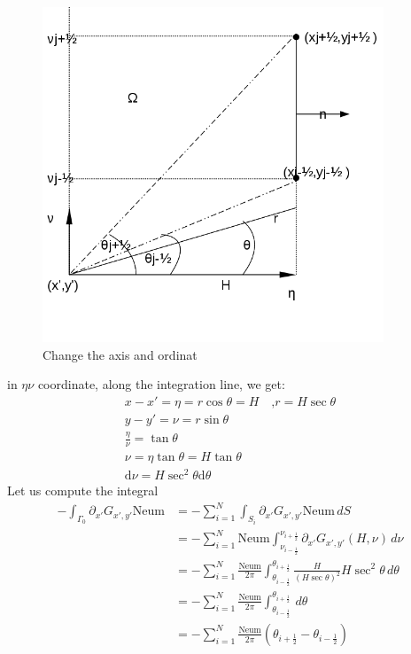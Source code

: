 \documentclass[a4paper,12pt]{article}
\renewcommand{\d}[0]{%
\ensuremath{\text{d}}}
\newcommand{\integ}[3]{%
\ensuremath{\displaystyle{\int^{#2}_{#1} #3}}}
\begin{document}
\begin{enumerate}
\begin{figure}[!htbp]
\begin{center}
\includegraphics[height = 10cm]{changeAxis.png}
\end{center}
 \caption{Change the axis and ordinat}\label{turnAxis}
\end{figure}
in $\eta\nu$ coordinate, along the integration line, we get:
\begin{align}
 x-x'=\eta=r \cos \theta=H \quad\text{,} r=H\sec\theta\\
y-y'=\nu= r\sin \theta\\
\frac{\eta}{\nu}= \tan\theta\\
\nu=\eta \tan \theta=H\tan \theta\\
\d \nu=H \sec^2\theta \d \theta
\end{align}
Let us compute the integral
\begin{align}
 -\integ{\Gamma_0}{}{\partial_{x'} G_{x',y'} \text{Neum}}&=-\sum\limits_{i=1}^N  \integ{S_i}{}{\partial_{x'} G_{x',y'} \text{Neum} \, dS}\\
&=-\sum\limits_{i=1}^N \text{Neum} \integ{\nu_{i-\frac{1}{2}}}{\nu_{i+\frac{1}{2}}}{\partial_{x'} G_{x',y'} (H,\nu) \, d\nu}\\
&=-\sum\limits_{i=1}^N \frac{\text{Neum}}{2\pi} \integ{\theta_{i-\frac{1}{2}}}{\theta_{i+\frac{1}{2}}}{\frac{H}{\left( H\sec\theta\right)^2 }H \sec^2\theta \, d\theta}\\
&=-\sum\limits_{i=1}^N \frac{\text{Neum}}{2\pi} \integ{\theta_{i-\frac{1}{2}}}{\theta_{i+\frac{1}{2}}}{\, d\theta}\\
&=-\sum\limits_{i=1}^N \frac{\text{Neum}}{2\pi} \left( \theta_{i+\frac{1}{2}}- \theta_{i-\frac{1}{2}} \right)\label{intPartialG}
\end{align}


\end{enumerate}
\end{document}
